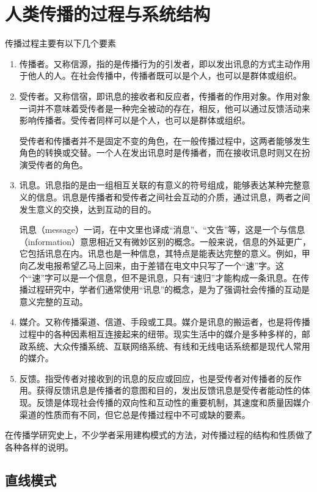 \documentclass[UTF8,12pt]{ctexart}
\numberwithin{equation}{section} %
\numberwithin{figure}{section}
\numberwithin{table}{section}
\begin{document}
	\section{人类传播的过程与系统结构}
	传播过程主要有以下几个要素
	\begin{enumerate}
		\item 传播者。又称信源，指的是传播行为的引发者，即以发出讯息的方式主动作用于他人的人。在社会传播中，传播者既可以是个人，也可以是群体或组织。
		
		\item 受传者。又称信宿，即讯息的接收者和反应者，传播者的作用对象。作用对象一词并不意味着受传者是一种完全被动的存在，相反，他可以通过反馈活动来影响传播者。受传者同样可以是个人，也可以是群体或组织。
		
		受传者和传播者并不是固定不变的角色，在一般传播过程中，这两者能够发生角色的转换或交替。一个人在发出讯息时是传播者，而在接收讯息时则又在扮演受传者的角色。
		
		\item 讯息。讯息指的是由一组相互关联的有意义的符号组成，能够表达某种完整意义的信息。讯息是传播者和受传者之间社会互动的介质，通过讯息，两者之间发生意义的交换，达到互动的目的。
		
		讯息（message）一词，在中文里也译成“消息”、“文告”等，这是一个与信息（information）意思相近又有微妙区别的概念。一般来说，信息的外延更广，它包括讯息在内。讯息也是一种信息，其特点是能表达完整的意义。例如，甲向乙发电报希望乙马上回来，由于差错在电文中只写了一个“速”字。这个“速”字可以是一个信息，但不是讯息，只有“速归”才能构成一条讯息。在传播过程研究中，学者们通常使用“讯息”的概念，是为了强调社会传播的互动是意义完整的互动。
		
		\item 媒介。又称传播渠道、信道、手段或工具。媒介是讯息的搬运者，也是将传播过程中的各种因素相互连接起来的纽带。现实生活中的媒介是多种多样的，邮政系统、大众传播系统、互联网络系统、有线和无线电话系统都是现代人常用的媒介。
		
		\item 反馈。指受传者对接收到的讯息的反应或回应，也是受传者对传播者的反作用。获得反馈讯息是传播者的意图和目的，发出反馈讯息是受传者能动性的体现。反馈是体现社会传播的双向性和互动性的重要机制，其速度和质量因媒介渠道的性质而有不同，但它总是传播过程中不可或缺的要素。
	\end{enumerate}
	
	在传播学研究史上，不少学者采用建构模式的方法，对传播过程的结构和性质做了各种各样的说明。
	
	\subsection{直线模式}
		
\end{document}
